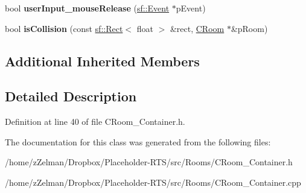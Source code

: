 \begin{DoxyCompactItemize}
\item 
\hypertarget{classCRoom__Container_adb9e0db332c48e7baabf55d7e14ac512}{bool {\bfseries user\-Input\-\_\-mouse\-Release} (\hyperlink{classsf_1_1Event}{sf\-::\-Event} $\ast$p\-Event)}\label{classCRoom__Container_adb9e0db332c48e7baabf55d7e14ac512}

\item 
\hypertarget{classCRoom__Container_a2eb1c5bc2aef2804cb15cbedd5fc649a}{bool {\bfseries is\-Collision} (const \hyperlink{classsf_1_1Rect}{sf\-::\-Rect}$<$ float $>$ \&rect, \hyperlink{classCRoom}{C\-Room} $\ast$\&p\-Room)}\label{classCRoom__Container_a2eb1c5bc2aef2804cb15cbedd5fc649a}

\end{DoxyCompactItemize}
\subsection*{Additional Inherited Members}


\subsection{Detailed Description}


Definition at line 40 of file C\-Room\-\_\-\-Container.\-h.



The documentation for this class was generated from the following files\-:\begin{DoxyCompactItemize}
\item 
/home/z\-Zelman/\-Dropbox/\-Placeholder-\/\-R\-T\-S/src/\-Rooms/C\-Room\-\_\-\-Container.\-h\item 
/home/z\-Zelman/\-Dropbox/\-Placeholder-\/\-R\-T\-S/src/\-Rooms/C\-Room\-\_\-\-Container.\-cpp\end{DoxyCompactItemize}
